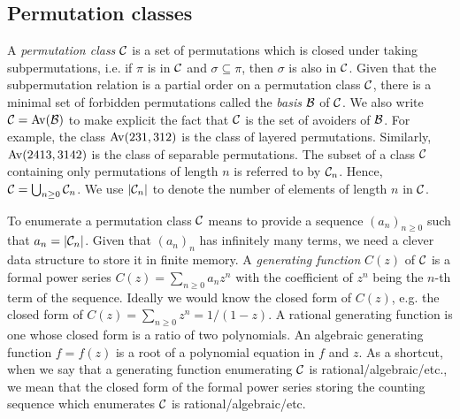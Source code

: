 \documentclass[12pt, a4paper, twoside]{report}
\begin{document}
\subsection{Permutation classes}
A \emph{permutation class} $\mathcal{C}$ is a set of permutations which is closed under taking subpermutations, i.e. if $\pi$ is in $\mathcal{C}$ and $\sigma \subseteq \pi$, then $\sigma$ is also in $\mathcal{C}$. Given that the subpermutation relation is a partial order on a permutation class $\mathcal{C}$, there is a minimal set of forbidden permutations called the \emph{basis} $\mathcal{B}$ of $\mathcal{C}$. We also write $\mathcal{C} = \mathrm{Av}(\mathcal{B})$ to make explicit the fact that $\mathcal{C}$ is the set of avoiders of $\mathcal{B}$. For example, the class $\mathrm{Av}(231,312)$ is the class of layered permutations. Similarly, $\mathrm{Av}(2413, 3142)$ is the class of separable permutations. The subset of a class $\mathcal{C}$ containing only permutations of length $n$ is referred to by $\mathcal{C}_n$. Hence, $\mathcal{C} = \bigcup_{n\geq0}\mathcal{C}_n$. We use $|\mathcal{C}_n|$ to denote the number of elements of length $n$ in $\mathcal{C}$. 

To enumerate a permutation class $\mathcal{C}$ means to provide a sequence $(a_n)_{n\geq 0}$ such that $a_n = |\mathcal{C}_n|$. Given that $(a_n)_n$ has infinitely many terms, we need a clever data structure to store it in finite memory. A \emph{generating function} $C(z)$ of $\mathcal{C}$ is a formal power series $C(z) = \sum_{n\geq 0}a_nz^n$ with the coefficient of $z^n$ being the $n$-th term of the sequence. Ideally we would know the closed form of $C(z)$, e.g. the closed form of $C(z) = \sum_{n\geq 0}z^n = 1/(1-z)$. A rational generating function is one whose closed form is a ratio of two polynomials. An algebraic generating function $f = f(z)$ is a root of a polynomial equation in $f$ and $z$. As a shortcut, when we say that a generating function enumerating $\mathcal{C}$ is rational/algebraic/etc., we mean that the closed form of the formal power series storing the counting sequence which enumerates $\mathcal{C}$ is rational/algebraic/etc.
\end{document}
